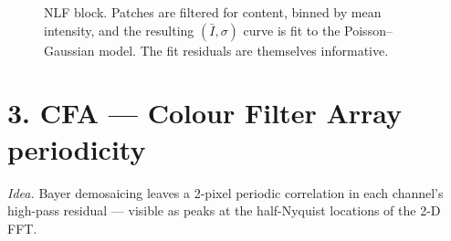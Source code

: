 \documentclass[11pt]{article}
\begin{document}
\begin{figure}[h]
\caption{NLF block. Patches are filtered for content, binned by mean
intensity, and the resulting $(\bar I,\sigma)$ curve is fit to the
Poisson--Gaussian model. The fit residuals are themselves informative.}
\end{figure}

\clearpage
\section*{3. CFA --- Colour Filter Array periodicity}

\noindent
\emph{Idea.} Bayer demosaicing leaves a 2-pixel periodic correlation in
each channel's high-pass residual --- visible as peaks at the
half-Nyquist locations of the 2-D FFT.
\end{document}
